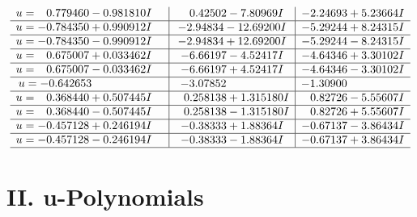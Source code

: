 \documentclass[1p]{elsarticle_modified}
\theoremstyle{definition}
\begin{document}
$$\begin{array}{c|c|c}
\begin{aligned}
u &= \phantom{-}0.779460 - 0.981810 I\end{aligned}
 & \phantom{-}0.42502 - 7.80969 I & -2.24693 + 5.23664 I \\ \hline\begin{aligned}
u &= -0.784350 + 0.990912 I\end{aligned}
 & -2.94834 - 12.69200 I & -5.29244 + 8.24315 I \\ \hline\begin{aligned}
u &= -0.784350 - 0.990912 I\end{aligned}
 & -2.94834 + 12.69200 I & -5.29244 - 8.24315 I \\ \hline\begin{aligned}
u &= \phantom{-}0.675007 + 0.033462 I\end{aligned}
 & -6.66197 - 4.52417 I & -4.64346 + 3.30102 I \\ \hline\begin{aligned}
u &= \phantom{-}0.675007 - 0.033462 I\end{aligned}
 & -6.66197 + 4.52417 I & -4.64346 - 3.30102 I \\ \hline\begin{aligned}
u &= -0.642653\phantom{ +0.000000I}\end{aligned}
 & -3.07852\phantom{ +0.000000I} & -1.30900\phantom{ +0.000000I} \\ \hline\begin{aligned}
u &= \phantom{-}0.368440 + 0.507445 I\end{aligned}
 & \phantom{-}0.258138 + 1.315180 I & \phantom{-}0.82726 - 5.55607 I \\ \hline\begin{aligned}
u &= \phantom{-}0.368440 - 0.507445 I\end{aligned}
 & \phantom{-}0.258138 - 1.315180 I & \phantom{-}0.82726 + 5.55607 I \\ \hline\begin{aligned}
u &= -0.457128 + 0.246194 I\end{aligned}
 & -0.38333 + 1.88364 I & -0.67137 - 3.86434 I \\ \hline\begin{aligned}
u &= -0.457128 - 0.246194 I\end{aligned}
 & -0.38333 - 1.88364 I & -0.67137 + 3.86434 I\\
 \hline 
 \end{array}$$\newpage
\newpage\renewcommand{\arraystretch}{1}
\centering \section*{ II. u-Polynomials}
\end{document}

